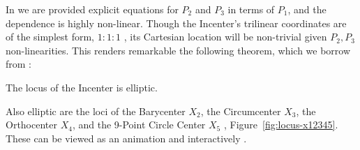 In \cite{ronaldo19} we are provided explicit equations for $P_2$ and $P_3$ in terms of $P_1$, and the dependence is highly non-linear. Though the Incenter's trilinear coordinates \cite{mw} are of the simplest form, $1:1:1$ \cite{etc}, its Cartesian location will be non-trivial given $P_2,P_3$ non-linearities. This renders remarkable the following theorem, which we borrow from \cite{olga14}: 

\begin{theorem}
The locus of the Incenter is elliptic.
\end{theorem}

Also elliptic are the loci of the Barycenter $X_2$, the Circumcenter $X_3$, the Orthocenter $X_4$, and the 9-Point Circle Center $X_5$ \cite{sergei2016,corentin19,ronaldo19}, Figure~\ref{fig:locus-x12345}. These can be viewed as an animation \cite[video \#1]{dsr_main_videos_2019} and interactively \cite{dsr_applet_x12345}.

